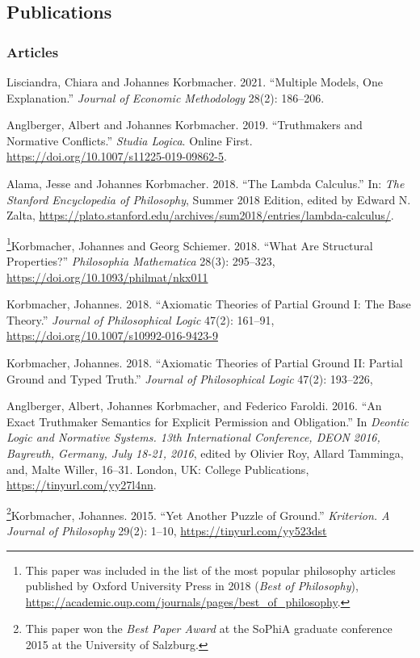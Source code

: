 \subsection*{Publications}
\subsubsection*{Articles}
\begin{etaremune}
  \item Lisciandra, Chiara and Johannes Korbmacher. 2021. ``Multiple Models, One Explanation.'' \emph{Journal of Economic Methodology} 28(2): 186--206.
  \item Anglberger, Albert and Johannes Korbmacher. 2019. ``Truthmakers and Normative Conflicts.'' \emph{Studia Logica}. Online First. \url{https://doi.org/10.1007/s11225-019-09862-5}.
  \item Alama, Jesse and Johannes Korbmacher. 2018. ``The Lambda Calculus.'' In: \emph{The Stanford Encyclopedia of Philosophy}, Summer 2018 Edition, edited by Edward N. Zalta, \url{https://plato.stanford.edu/archives/sum2018/entries/lambda-calculus/}.
  \item \footnote{This paper was included in the list of the most popular philosophy articles published by Oxford University Press in 2018 (\emph{Best of Philosophy}), \url{https://academic.oup.com/journals/pages/best_of_philosophy}.}Korbmacher, Johannes and Georg Schiemer. 2018. ``What Are Structural Properties?'' \emph{Philosophia Mathematica} 28(3): 295--323, \url{https://doi.org/10.1093/philmat/nkx011}
  \item Korbmacher, Johannes. 2018. ``Axiomatic Theories of Partial Ground I: The Base Theory.'' \emph{Journal of Philosophical Logic} 47(2): 161--91, \url{https://doi.org/10.1007/s10992-016-9423-9}
  \item Korbmacher, Johannes. 2018. ``Axiomatic Theories of Partial Ground II: Partial Ground and Typed Truth.'' \emph{Journal of Philosophical Logic} 47(2): 193--226,
  \item Anglberger, Albert, Johannes Korbmacher, and Federico Faroldi. 2016. ``An Exact Truthmaker Semantics for Explicit Permission and Obligation.'' In \emph{Deontic Logic and Normative Systems. 13th International Conference, DEON 2016, Bayreuth, Germany, July 18-21, 2016}, edited by Olivier Roy, Allard Tamminga, and, Malte Willer, 16--31. London, UK: College Publications, \url{https://tinyurl.com/yy27l4nn}.
  \item \footnote{This paper won the \emph{Best Paper Award} at the SoPhiA graduate conference 2015 at the University of Salzburg.}Korbmacher, Johannes. 2015. ``Yet Another Puzzle of Ground.'' \emph{Kriterion. A Journal of Philosophy} 29(2): 1--10, \url{https://tinyurl.com/yy523dst}

\end{etaremune}
